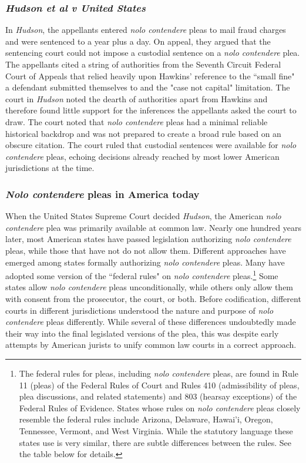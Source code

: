 \subsubsection{\textit{Hudson et al v United States}}

In \textit{Hudson}, the appellants entered \textit{nolo contendere} pleas to mail fraud charges and were sentenced to a year plus a day. On appeal, they argued that the sentencing court could not impose a custodial sentence on a \textit{nolo contendere} plea. The appellants cited a string of authorities from the Seventh Circuit Federal Court of Appeals that relied heavily upon Hawkins' reference to the ``small fine" a defendant submitted themselves to and the "case not capital" limitation. The court in \textit{Hudson} noted the dearth of authorities apart from Hawkins and therefore found little support for the inferences the appellants asked the court to draw. The court noted that \textit{nolo contendere} pleas had a minimal reliable historical backdrop and was not prepared to create a broad rule based on an obscure citation. The court ruled that custodial sentences were available for \textit{nolo contendere} pleas, echoing decisions already reached by most lower American jurisdictions at the time.

\subsubsection{\textit{Nolo contendere} pleas in America today}

When the United States Supreme Court decided \textit{Hudson}, the American \textit{nolo contendere} plea was primarily available at common law. Nearly one hundred years later, most American states have passed legislation authorizing \textit{nolo contendere} pleas, while those that have not do not allow them. Different approaches have emerged among states formally authorizing \textit{nolo contendere} pleas. Many have adopted some version of the ``federal rules" on \textit{nolo contendere} pleas.\footnote{The federal rules for pleas, including \textit{nolo contendere} pleas, are found in Rule 11 (pleas) of the Federal Rules of Court and Rules 410 (admissibility of pleas, plea discussions, and related statements) and 803 (hearsay exceptions) of the Federal Rules of Evidence. States whose rules on \textit{nolo contendere} pleas closely resemble the federal rules include Arizona, Delaware, Hawai'i, Oregon, Tennessee, Vermont, and West Virginia. While the statutory language these states use is very similar, there are subtle differences between the rules. See the table below for details.} Some states allow \textit{nolo contendere} pleas unconditionally, while others only allow them with consent from the prosecutor, the court, or both. Before codification, different courts in different jurisdictions understood the nature and purpose of \textit{nolo contendere} pleas differently. While several of these differences undoubtedly made their way into the final legislated versions of the plea, this was despite early attempts by American jurists to unify common law courts in a correct approach.

